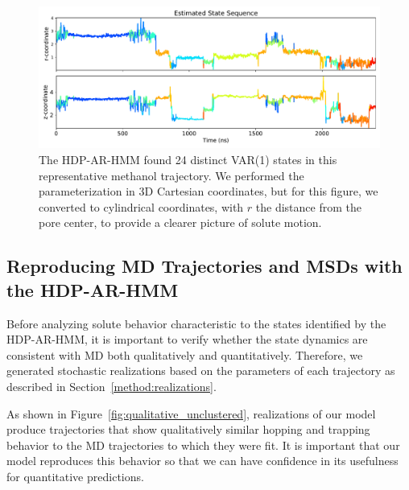 \documentclass[journal=jpcbfk,manuscript=article]{achemso}
\begin{document}
  \begin{figure}
  \centering
  \includegraphics[width=\textwidth]{rz_unclustered_MET.pdf}
  \caption{The HDP-AR-HMM found 24 distinct VAR(1) states in this representative methanol trajectory.
  We performed the parameterization in 3D Cartesian coordinates, but for this figure, we 
  converted to cylindrical coordinates, with $r$ the distance from the pore center, to 
  provide a clearer picture of solute motion.}\label{fig:rz_unclustered}
  \end{figure}
  
  \subsection{Reproducing MD Trajectories and MSDs with the HDP-AR-HMM}\label{section:unclustered_MSD_prediction}

  Before analyzing solute behavior characteristic to the states identified by the
  HDP-AR-HMM, it is important to verify whether the state dynamics are consistent with MD
  both qualitatively and quantitatively. Therefore, we generated stochastic 
  realizations based on the parameters of each trajectory as described in 
  Section~\ref{method:realizations}.
  
  As shown in Figure~\ref{fig:qualitative_unclustered}, realizations of our model 
  produce trajectories that show qualitatively similar hopping and trapping 
  behavior to the MD trajectories to which they were fit. It is important that our
  model reproduces this behavior so that we can have confidence in its usefulness
  for quantitative predictions.
  
\end{document}
